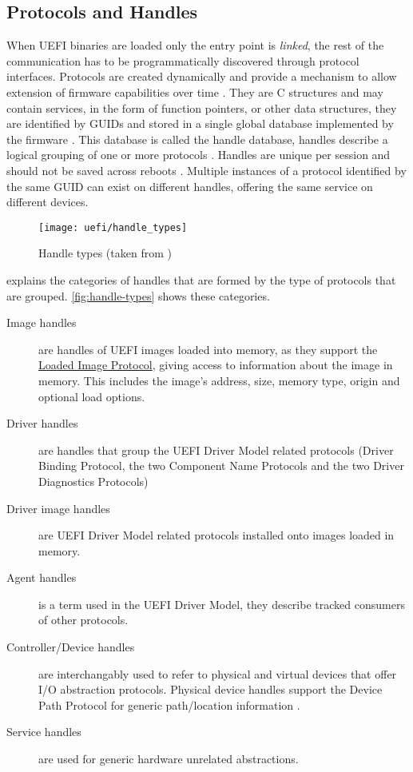 \subsection{Protocols and Handles}

When \ac{UEFI} binaries are loaded only the entry point is \emph{linked}, the rest of the communication has to be programmatically discovered through protocol interfaces.
Protocols are created dynamically and provide a mechanism to allow extension of firmware capabilities over time \cite[Section 3.6]{tianocore-edk2-driver-writer-s-guide}.
They are C structures and may contain services, in the form of function pointers, or other data structures, they are identified by \acp{GUID} and stored in a single global database implemented by the firmware \cite{beyond-bios}.
This database is called the handle database, handles describe a logical grouping of one or more protocols \cite[Section 3.6]{tianocore-edk2-driver-writer-s-guide}.
Handles are unique per session and should not be saved across reboots \cite{beyond-bios}.
Multiple instances of a protocol identified by the same \ac{GUID} can exist on different handles, offering the same service on different devices.

\begin{figure}[htb]%
    \centering%
    \texttt{[image: uefi/handle\_types]}%
    \caption{Handle types (taken from \cite[Figure 3]{tianocore-edk2-driver-writer-s-guide})}%
    \label{fig:handle-types}%
\end{figure}

\cite{tianocore-edk2-driver-writer-s-guide} explains the categories of handles that are formed by the type of protocols that are grouped. \autoref{fig:handle-types} shows these categories.

\begin{description}
    \item[Image handles] are handles of \ac{UEFI} images loaded into memory, as they support the \hyperref[lst:loaded-image-protocol]{Loaded Image Protocol}, giving access to information about the image in memory. This includes the image's address, size, memory type, origin and optional load options.
    \item[Driver handles] are handles that group the \ac{UEFI} Driver Model related protocols (Driver Binding Protocol, the two Component Name Protocols and the two Driver Diagnostics Protocols)
    \item[Driver image handles] are \ac{UEFI} Driver Model related protocols installed onto images loaded in memory.
    \item[Agent handles] is a term used in the \ac{UEFI} Driver Model, they describe tracked consumers of other protocols.
    \item[Controller/Device handles] are interchangably used to refer to physical and virtual devices that offer \ac{I/O} abstraction protocols.
        Physical device handles support the Device Path Protocol for generic path/location information \cite[Section 10.2]{uefi-spec}.
    \item[Service handles] are used for generic hardware unrelated abstractions.
\end{description}

